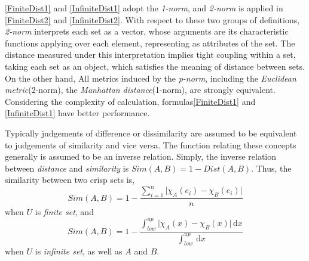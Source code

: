 \eqref{FiniteDist1} and \eqref{InfiniteDist1} adopt the \textit{1-norm}, and \textit{2-norm} is applied in \eqref{FiniteDist2} and \eqref{InfiniteDist2}. With respect to these two groups of definitions, \textit{2-norm} interprets each set as a vector, whose arguments are its characteristic functions applying over each element, representing as attributes of the set. The distance measured under this interpretation implies tight coupling within a set, taking each set as an object, which satisfies the meaning of distance between sets. On the other hand, All metrics induced by the \textit{p-norm}, including the \textit{Euclidean metric}(2-norm), the \textit{Manhattan distance}(1-norm), are strongly equivalent. Considering the complexity of calculation, formulas\eqref{FiniteDist1} and \eqref{InfiniteDist1} have better performance. 

Typically judgements of difference or dissimilarity are assumed to be equivalent to judgements of similarity and vice versa. The function relating these concepts generally is assumed to be an inverse relation. Simply, the inverse relation between \textit{distance} and \textit{similarity} is $Sim(A,B)=1-Dist(A,B)$. Thus, the similarity between two crisp sets is,
\begin{equation}\label{FiniteSimApproximateBase}
Sim(A,B)=1- \frac{\sum_{i=1}^{n} \lvert \chi_{A}(e_i) - \chi_{B}(e_i) \rvert}{n}
\end{equation}
when $U$ is \textit{finite set}, and
\begin{equation}\label{InfiniteSimApproximateBase}
Sim(A,B)=1- \frac{\int_{low}^{up} \lvert \chi_{A}(x) - \chi_{B}(x) \rvert\, \mathrm{d}x}{\int_{low}^{up}\, \mathrm{d}x}
\end{equation}
when $U$ is \textit{infinite set}, as well as $A$ and $B$.